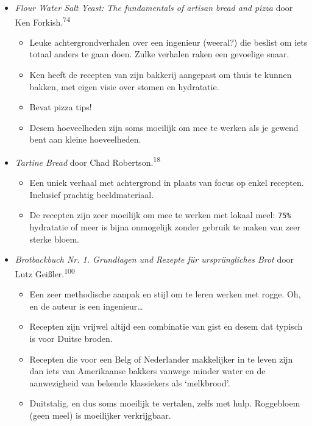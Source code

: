 \documentclass[
  11pt,
  dutch,
]{memoir}
\providecommand{\tightlist}{%
  \setlength{\itemsep}{0pt}\setlength{\parskip}{0pt}}
\begin{document}
\begin{itemize}
\tightlist
\item
  \emph{Flour Water Salt Yeast: The fundamentals of artisan bread and
  pizza} door Ken Forkish.\textsuperscript{74}

  \begin{itemize}
  \tightlist
  \item
    Leuke achtergrondverhalen over een ingenieur (weeral?) die beslist
    om iets totaal anders te gaan doen. Zulke verhalen raken een
    gevoelige snaar.
  \item
    Ken heeft de recepten van zijn bakkerij aangepast om thuis te kunnen
    bakken, met eigen visie over stomen en hydratatie.
  \item
    Bevat pizza tips!
  \item
    Desem hoeveelheden zijn soms moeilijk om mee te werken als je gewend
    bent aan kleine hoeveelheden.
  \end{itemize}
\item
  \emph{Tartine Bread} door Chad Robertson.\textsuperscript{18}

  \begin{itemize}
  \tightlist
  \item
    Een uniek verhaal met achtergrond in plaats van focus op enkel
    recepten. Inclusief prachtig beeldmateriaal.
  \item
    De recepten zijn zeer moeilijk om mee te werken met lokaal meel:
    \texttt{75\%} hydratatie of meer is bijna onmogelijk zonder gebruik
    te maken van zeer sterke bloem.
  \end{itemize}
\item
  \emph{Brotbackbuch Nr. 1. Grundlagen und Rezepte für ursprüngliches
  Brot} door Lutz Geißler.\textsuperscript{100}

  \begin{itemize}
  \tightlist
  \item
    Een zeer methodische aanpak en stijl om te leren werken met rogge.
    Oh, en de auteur is een ingenieur\ldots{}
  \item
    Recepten zijn vrijwel altijd een combinatie van gist en desem dat
    typisch is voor Duitse broden.
  \item
    Recepten die voor een Belg of Nederlander makkelijker in te leven
    zijn dan iets van Amerikaanse bakkers vanwege minder water en de
    aanwezigheid van bekende klassiekers als `melkbrood'.
  \item
    Duitstalig, en dus soms moeilijk te vertalen, zelfs met hulp.
    Roggebloem (geen meel) is moeilijker verkrijgbaar.
  \end{itemize}
\end{itemize}
\end{document}
